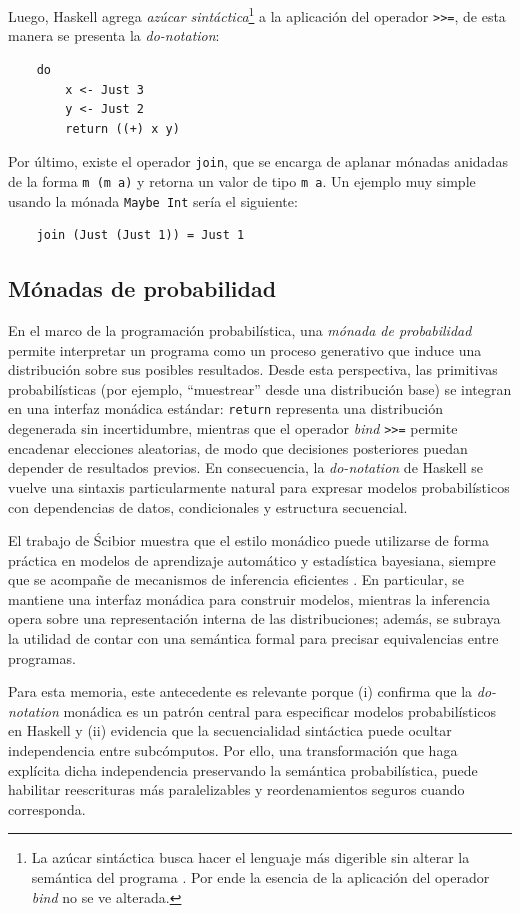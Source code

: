 \newpage

Luego, \textsf{Haskell} agrega \textit{azúcar sintáctica}\footnote{La azúcar sintáctica busca hacer el lenguaje más digerible sin alterar la semántica del programa \cite{Pombrio2018}. Por ende la esencia de la aplicación del operador \textit{bind} no se ve alterada.} a la aplicación del operador \verb|>>=|, de esta manera se presenta la \textit{do-notation}:

\begin{verbatim}
    do
        x <- Just 3
        y <- Just 2
        return ((+) x y)
\end{verbatim}

Por último, existe el operador \verb|join|, que se encarga de aplanar mónadas anidadas de la forma \verb|m (m a)| y retorna un valor de tipo \verb|m a|. Un ejemplo muy simple usando la mónada \verb|Maybe Int| sería el siguiente:

\begin{verbatim}
    join (Just (Just 1)) = Just 1
\end{verbatim}

\subsection{Mónadas de probabilidad}

En el marco de la programación probabilística, una \textit{mónada de probabilidad} permite interpretar un programa como un proceso generativo que induce una distribución sobre sus posibles resultados. Desde esta perspectiva, las primitivas probabilísticas (por ejemplo, ``muestrear'' desde una distribución base) se integran en una interfaz monádica estándar: \texttt{return} representa una distribución degenerada sin incertidumbre, mientras que el operador \textit{bind} \verb|>>=| permite encadenar elecciones aleatorias, de modo que decisiones posteriores puedan depender de resultados previos. En consecuencia, la \textit{do-notation} de \textsf{Haskell} se vuelve una sintaxis particularmente natural para expresar modelos probabilísticos con dependencias de datos, condicionales y estructura secuencial.

El trabajo de Ścibior muestra que el estilo monádico puede utilizarse de forma práctica en modelos de aprendizaje automático y estadística bayesiana, siempre que se acompañe de mecanismos de inferencia eficientes \cite{ScibiorGG2015}. En particular, se mantiene una interfaz monádica para construir modelos, mientras la inferencia opera sobre una representación interna de las distribuciones; además, se subraya la utilidad de contar con una semántica formal para precisar equivalencias entre programas.

Para esta memoria, este antecedente es relevante porque (i) confirma que la \textit{do-notation} monádica es un patrón central para especificar modelos probabilísticos en \textsf{Haskell} y (ii) evidencia que la secuencialidad sintáctica puede ocultar independencia entre subcómputos. Por ello, una transformación que haga explícita dicha independencia preservando la semántica probabilística, puede habilitar reescrituras más paralelizables y reordenamientos seguros cuando corresponda.

\newpage